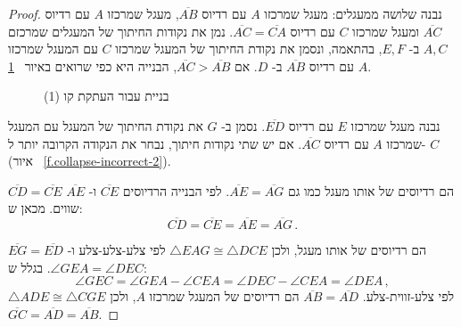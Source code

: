 \begin{proof}

נבנה שלושה ממעגלים: מעגל שמרכזו
$A$
עם רדיוס
$\overline{AB}$,
מעגל שמרכזו
$A$
עם רדיוס
$\overline{AC}$
ומעגל שמרכזו
$C$
עם רדיוס
$\overline{AC}=\overline{CA}$.
נמן את נקודות החיתוך של המעגלים שמרכזם 
$A,C$
ב-%
$E,F$,
בהתאמה, ונסמן את נקודת החיתוך של המעגל שמרכזו
$C$
עם המעגל שמרכזו 
$A$
עם רדיוס
$\overline{AB}$
ב-%
$D$.
אם
$\overline{AC}>\overline{AB}$,
הבנייה היא כפי שרואים באיור%
~\ref{f.collapse-incorrect-1}.
\begin{figure}[tb]
\begin{center}
\end{center}
\caption{בניית עבור העתקת קו (1)}\label{f.collapse-incorrect-1}
\end{figure}

נבנה מעגל שמרכזו 
$E$
עם רדיוס 
$\overline{ED}$.
נסמן ב-%
$G$
את נקודת החיתוך של המעגל עם המעגל שמרכזו
$A$
עם רדיוס 
$\overline{AC}$.
אם יש שתי נקודות חיתוך, נבחר את הנקודה הקרובה יותר ל-%
$C$
(איור~%
\ref{f.collapse-incorrect-2}).

\newpage

$\overline{CD}=\overline{CE}$
הם רדיוסים של אותו מעגל כמו גם
$\overline{AE}=\overline{AG}$.
לפי הבנייה הרדיוסים 
$\overline{CE}$
ו-%
$\overline{AE}$
שווים. מכאן ש:
\[
\overline{CD} = \overline{CE} = \overline{AE} = \overline{AG}\,.
\]

\newpage

$\overline{EG} = \overline{ED}$
הם רדיוסים של אותו מעגל, ולכן
$\triangle EAG\cong \triangle DCE$
לפי צלע-צלע-צלע ו-%
$\angle GEA = \angle DEC$.
בגלל ש:
\[
\angle GEC = \angle GEA \!-\!\angle CEA = \angle DEC\!-\!\angle CEA = \angle DEA\,,
\]
$\triangle ADE\cong\triangle CGE$ 
לפי צלע-זווית-צלע.
$\overline{AB}=\overline{AD}$
הם רדיוסים של המעגל שמרכזו
$A$,
ולכן
$\overline{GC}=\overline{AD}=\overline{AB}$.
\end{proof}

